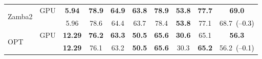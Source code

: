 \begin{table}[t]
\begin{center}
\begin{tabular}{llcccccccc}
      \midrule
      \multirow{2}{*}{Zamba2} & GPU & \textbf{5.94} &
      \textbf{78.9} & \textbf{64.9} & \textbf{63.8} & \textbf{78.9} &
      \textbf{53.8} & \textbf{77.7} & \textbf{69.0} \\
      & \sysname{} & 5.96 & 78.6 & 64.4 & 63.7 & 78.4
      & \textbf{53.8} & 77.1 & 68.7~\textcolor{black}{(--0.3)}\\

      \midrule
      \multirow{2}{*}[-2pt]{OPT} & GPU & \textbf{12.29} & \textbf{76.2} &
      \textbf{63.3} & \textbf{50.5} & \textbf{65.6} & \textbf{30.6} & 65.1 &
      \textbf{56.3} \\ & \sysname{} & \textbf{12.29} & 76.1 & 63.2 &
      \textbf{50.5} & \textbf{65.6} & 30.3 & \textbf{65.2} &
      56.2~\textcolor{black}{(--0.1)} \\

      \bottomrule[1pt]
    \end{tabular}
  \end{center}
\end{table}
\endgroup
